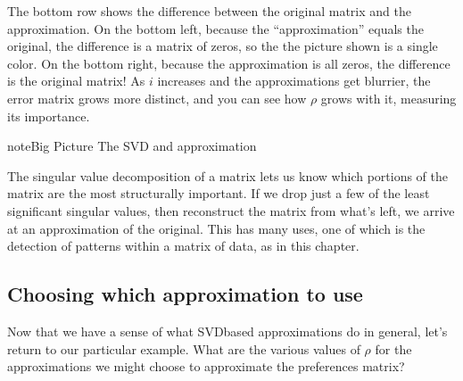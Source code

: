 \documentclass[letterpaper,10pt,english]{jupyterBook}
\begin{document}
\sphinxAtStartPar
{}

\sphinxAtStartPar
The bottom row shows the difference between the original matrix and the approximation.  On the bottom left, because the “approximation” equals the original, the difference is a matrix of zeros, so the the picture shown is a single color.  On the bottom right, because the approximation is all zeros, the difference is the original matrix!  As \(i\) increases and the approximations get blurrier, the error matrix grows more distinct, and you can see how \(\rho\) grows with it, measuring its importance.

\begin{sphinxadmonition}{note}{Big Picture \sphinxhyphen{} The SVD and approximation}

\sphinxAtStartPar
The singular value decomposition of a matrix lets us know which portions of the matrix are the most structurally important.  If we drop just a few of the least significant singular values, then reconstruct the matrix from what’s left, we arrive at an approximation of the original.  This has many uses, one of which is the detection of patterns within a matrix of data, as in this chapter.
\end{sphinxadmonition}


\subsection{Choosing which approximation to use}
\label{\detokenize{chapter-16-matrices:choosing-which-approximation-to-use}}
\sphinxAtStartPar
Now that we have a sense of what SVD\sphinxhyphen{}based approximations do in general, let’s return to our particular example.  What are the various values of \(\rho\) for the approximations we might choose to approximate the preferences matrix?

\begin{sphinxVerbatim}[commandchars=\\\{\}]
\PYG{p}{[}           \PYG{p}{]}
\end{sphinxVerbatim}

\begin{sphinxVerbatim}[commandchars=\\\{\}]
[1.0,
 1.8996640677931257e\PYGZhy{}09,
 0.32212667929693095,
 0.5422162727569354,
 0.6921213328320459,
 0.8460293400488615,
 1.0]
\end{sphinxVerbatim}
\end{document}
